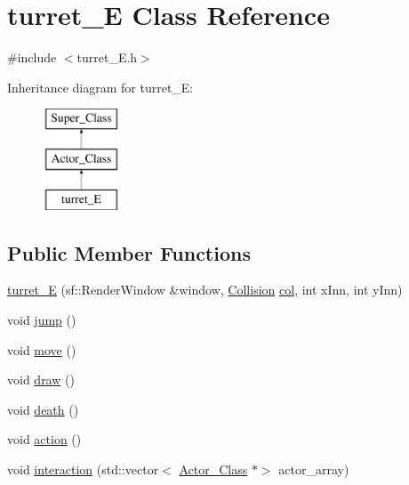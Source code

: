 \hypertarget{classturret___e}{}\section{turret\+\_\+E Class Reference}
\label{classturret___e}


{\ttfamily \#include $<$turret\+\_\+\+E.\+h$>$}

Inheritance diagram for turret\+\_\+E\+:\begin{figure}[H]
\begin{center}
\leavevmode
\includegraphics[height=3.000000cm]{classturret___e}
\end{center}
\end{figure}
\subsection*{Public Member Functions}
\begin{DoxyCompactItemize}
\item 
\hyperlink{classturret___e_a4094014d790c366a5f4d7d5ec80ce49b}{turret\+\_\+E} (sf\+::\+Render\+Window \&window, \hyperlink{class_collision}{Collision} \hyperlink{classturret___e_ad7bd8a3d29a005506463104ef6fb3d3b}{col}, int x\+Inn, int y\+Inn)
\item 
void \hyperlink{classturret___e_a74827456c32525695ee09d5577c55fd4}{jump} ()
\item 
void \hyperlink{classturret___e_a126e7a9b7731b83d5cdb3661807370bb}{move} ()
\item 
void \hyperlink{classturret___e_a55fc34335f9afb92a126da741a82f62a}{draw} ()
\item 
void \hyperlink{classturret___e_a7a5f3abce3a117af243be16265f84c6c}{death} ()
\item 
void \hyperlink{classturret___e_ae171d53d23f25be7b0e76360803b2cf4}{action} ()
\item 
void \hyperlink{classturret___e_a34cfbe8887180d443eca15fd71370964}{interaction} (std\+::vector$<$ \hyperlink{class_actor___class}{Actor\+\_\+\+Class} $\ast$$>$ actor\+\_\+array)
\end{DoxyCompactItemize}
